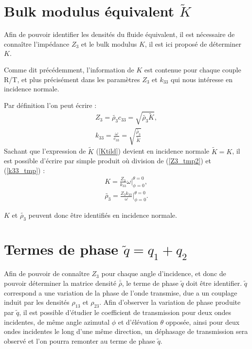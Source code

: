 \documentclass[12pt]{report}
\begin{document}
\section{Bulk modulus équivalent $\tilde{K}$}
\label{Ch_Inv_S_K}
Afin de pouvoir identifier les densités du fluide équivalent, il est nécessaire de connaître l'impédance $Z_3$  et le bulk modulus $K$, il est ici proposé de déterminer $K$.
    
    Comme dit précédemment, l'information de $K$ est contenue pour chaque couple R/T, et plus précisément dans les paramètres $Z_3$ et $k_{33}$ qui nous intéresse en incidence normale.
    
    Par définition l'on peut écrire :
    \begin{align}
        Z_3=\tilde{\rho_3}c_{33}=\sqrt{\tilde{\rho_3}\tilde{K}},\label{Z3_tmp2}\\
        k_{33}=\frac{\omega}{c_{33}}=\sqrt{\frac{\tilde{\rho_3}}{\tilde{K}}}\label{k33_tmp}
    \end{align}
    Sachant que l'expression de $\tilde{K}$ (\ref{Ktild}) devient en incidence normale $\tilde{K}=K$, il est possible d'écrire par simple produit où division de (\ref{Z3_tmp2}) et (\ref{k33_tmp}) :
    \begin{align}
        K=\frac{Z_3}{k_{33}}\omega|^{\theta=0}_{\phi=0},\label{K}\\
        \tilde{\rho_3}=\frac{Z_3k_{33}}{\omega}|^{\theta=0}_{\phi=0}.\label{rho3tild_id}
    \end{align}
    
    $K$ et $\tilde{\rho_3}$ peuvent donc être identifiés en incidence normale.

\section{Termes de phase $\tilde{q}=q_1+q_2$}
\label{Ch_Inv_S_q}
    Afin de pouvoir de connaître $Z_3$ pour chaque angle d'incidence, et donc de pouvoir déterminer la matrice densité $\bar{\bar{\rho}}$, le terme de phase $\tilde{q}$ doit être identifier. $\tilde{q}$ correspond a une variation de la phase de l'onde transmise, due a un couplage induit par les densités $\rho_{13}$ et $\rho_{23}$. Afin d'observer la variation de phase produite par $\tilde{q}$, il est possible d'étudier le coefficient de transmission pour deux ondes incidentes, de même angle azimutal $\phi$ et d'élévation $\theta $ opposée, ainsi pour deux ondes incidentes le long d'une même direction, un déphasage de transmission sera observé et l'on pourra remonter au terme de phase $\tilde{q}$.
    
\end{document}
